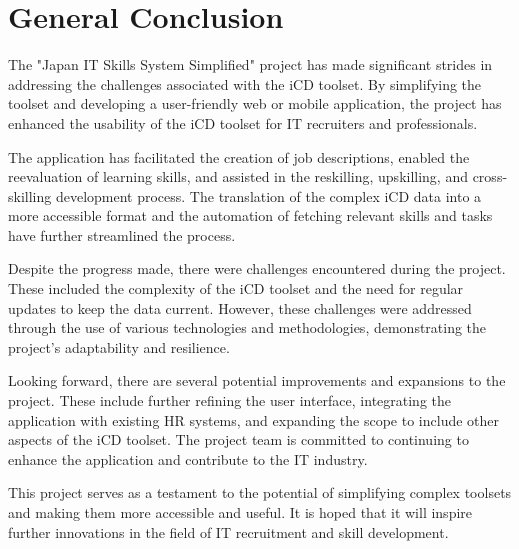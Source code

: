 \thispagestyle{plain} %
\section*{General Conclusion}
The "Japan IT Skills System Simplified" project has made significant strides in addressing the challenges associated with the iCD toolset. By simplifying the toolset and developing a user-friendly web or mobile application, the project has enhanced the usability of the iCD toolset for IT recruiters and professionals.

The application has facilitated the creation of job descriptions, enabled the reevaluation of learning skills, and assisted in the reskilling, upskilling, and cross-skilling development process. The translation of the complex iCD data into a more accessible format and the automation of fetching relevant skills and tasks have further streamlined the process.

Despite the progress made, there were challenges encountered during the project. These included the complexity of the iCD toolset and the need for regular updates to keep the data current. However, these challenges were addressed through the use of various technologies and methodologies, demonstrating the project's adaptability and resilience.

Looking forward, there are several potential improvements and expansions to the project. These include further refining the user interface, integrating the application with existing HR systems, and expanding the scope to include other aspects of the iCD toolset. The project team is committed to continuing to enhance the application and contribute to the IT industry.

This project serves as a testament to the potential of simplifying complex toolsets and making them more accessible and useful. It is hoped that it will inspire further innovations in the field of IT recruitment and skill development.
